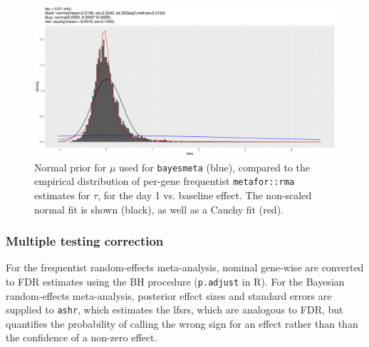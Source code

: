 \begin{figure}
    \includegraphics[width=1.0\textwidth,page=1]{mainmatter/figures/chapter_02/meta.bayesmeta.priors.coefName_d1.vs.d0.pdf}
    \caption{Normal prior for $\mu$ used for \texttt{bayesmeta} (blue), compared to the empirical distribution of per-gene frequentist \texttt{metafor::rma} estimates for $\tau$, for the day 1 vs. baseline effect. The non-scaled normal fit is shown (black), as well as a Cauchy fit (red).}
    \label{fig:hird_dgeMeta_priors_mu}
\end{figure}

\subsubsection{Multiple testing correction}

For the frequentist random-effects meta-analysis, nominal gene-wise \pvalues{} are converted to \gls{FDR} estimates using the \gls{BH} procedure (\texttt{p.adjust} in R).
For the Bayesian random-effects meta-analysis, posterior effect sizes and standard errors are supplied to \texttt{ashr}, which estimates the \glspl{lfsr}, which are analogous to \gls{FDR}, but quantifies the probability of calling the wrong sign for an effect rather than than the confidence of a non-zero effect\autocite{stephens2016FalseDiscoveryRates}.
%

